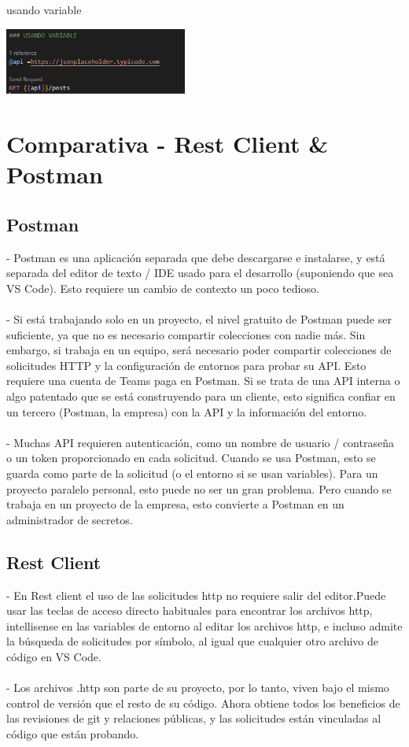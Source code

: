 \documentclass[twoside,twocolumn]{article}
\begin{document}
usando variable 
\begin{center}
	\includegraphics[width=6cm]{./imagenes/5.png} 
	\end{center}

\section{Comparativa - Rest Client & Postman}
\subsection{Postman}
- Postman es una aplicación separada que debe descargarse e instalarse, y está separada del editor de texto / IDE usado para el desarrollo (suponiendo que sea VS Code). Esto requiere un cambio de contexto un poco tedioso.\\\\
- Si está trabajando solo en un proyecto, el nivel gratuito de Postman puede ser suficiente, ya que no es necesario compartir colecciones con nadie más. Sin embargo, si trabaja en un equipo, será necesario poder compartir colecciones de solicitudes HTTP y la configuración de entornos para probar su API. Esto requiere una cuenta de Teams paga en Postman. Si se trata de una API interna o algo patentado que se está construyendo para un cliente, esto significa confiar en un tercero (Postman, la empresa) con la API y la información del entorno.\\\\
- Muchas API requieren autenticación, como un nombre de usuario / contraseña o un token proporcionado en cada solicitud. Cuando se usa Postman, esto se guarda como parte de la solicitud (o el entorno si se usan variables). Para un proyecto paralelo personal, esto puede no ser un gran problema. Pero cuando se trabaja en un proyecto de la empresa, esto convierte a Postman en un administrador de secretos.
\subsection{Rest Client}
- En Rest client el uso de las solicitudes http no requiere salir del editor.Puede usar las teclas de acceso directo habituales para encontrar los archivos http, intellisense en las variables de entorno al editar los archivos http, e incluso admite la búsqueda de solicitudes por símbolo, al igual que cualquier otro archivo de código en VS Code.\\\\
- Los archivos .http son parte de su proyecto, por lo tanto, viven bajo el mismo control de versión que el resto de su código. Ahora obtiene todos los beneficios de las revisiones de git y relaciones públicas, y las solicitudes están vinculadas al código que están probando. 
\end{document}

